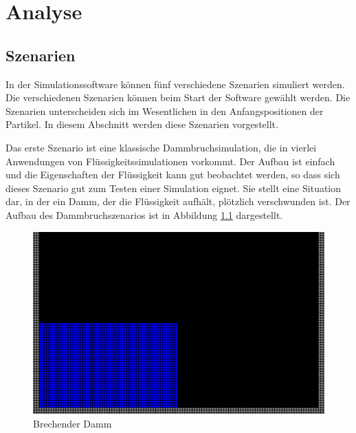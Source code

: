 \documentclass{scrreprt}
\begin{document}
\chapter{Analyse}


\section{Szenarien}
In der Simulationssoftware können fünf verschiedene Szenarien simuliert werden.
Die verschiedenen Szenarien können beim Start der Software gewählt werden.
Die Szenarien unterscheiden sich im Wesentlichen in den Anfangspositionen der Partikel.
In diesem Abschnitt werden diese Szenarien vorgestellt.

Das erste Szenario ist eine klassische Dammbruchsimulation, die in vierlei Anwendungen von Flüssigkeitssimulationen vorkommt.
Der Aufbau ist einfach und die Eigenschaften der Flüssigkeit kann gut beobachtet werden, so dass sich dieses Szenario gut zum Testen einer Simulation eignet.
Sie stellt eine Situation dar, in der ein Damm, der die Flüssigkeit aufhält, plötzlich verschwunden ist.
Der Aufbau des Dammbruchszenarios ist in Abbildung \ref{image:breaking_dam} dargestellt.
\begin{figure}[htb]
    \includegraphics[width=\textwidth]{Dammbruch.png}
    \caption{Brechender Damm}
    \label{image:breaking_dam}
\end{figure}
\end{document}
